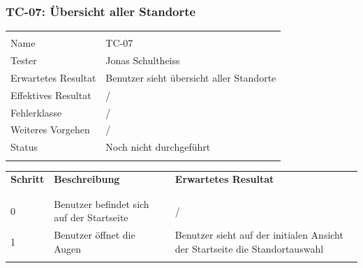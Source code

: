 \subsubsection{TC-07: Übersicht aller Standorte}
\begin{table}[H]
  \begin{tabularx}{\textwidth}{l X}\hline \\
  Name & TC-07 \\
  Tester & Jonas Schultheiss \\
  Erwartetes Resultat & Benutzer sieht übersicht aller Standorte \\
  Effektives Resultat & / \\
  Fehlerklasse & / \\
  Weiteres Vorgehen & / \\
  Status & Noch nicht durchgeführt \\
  \\\hline
  \end{tabularx}
\end{table}
\begin{table}[H]
  \begin{tabularx}{\textwidth}{l X X}
  \textbf{Schritt} & \textbf{Beschreibung} & \textbf{Erwartetes Resultat}\\ \\\hline \\
  0 & Benutzer befindet sich auf der Startseite  & / \\
  1 & Benutzer öffnet die Augen & Benutzer sieht auf der initialen Ansicht der Startseite die Standortauswahl \\
  \\\hline
  \end{tabularx}
\end{table}
\pagebreak
